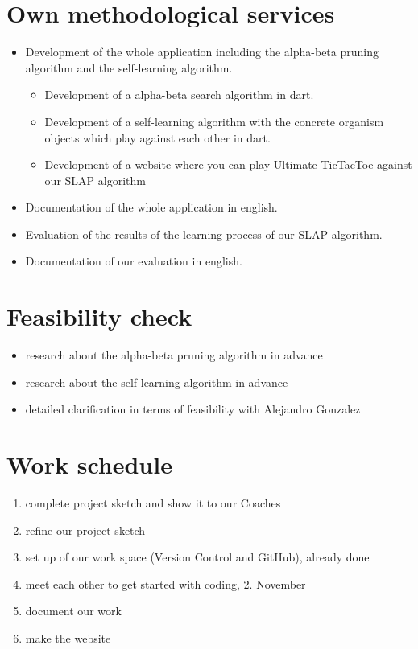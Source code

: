 \section{Own methodological services}
\begin{itemize}
    \item Development of the whole application including the alpha-beta pruning algorithm and the self-learning algorithm.
    \begin{itemize}
	    \item Development of a alpha-beta search algorithm in dart.
	    \item Development of a self-learning algorithm with the concrete organism objects which play against each other in dart.
	    \item Development of a website where you can play Ultimate TicTacToe against our SLAP algorithm
    \end{itemize}
    \item Documentation of the whole application in english.
    \item Evaluation of the results of the learning process of our SLAP algorithm.
    \item Documentation of our evaluation in english.
\end{itemize}


\section{Feasibility check}
\begin{itemize}
    \item research about the alpha-beta pruning algorithm in advance
    \item research about the self-learning algorithm in advance
    \item detailed clarification in terms of feasibility with Alejandro Gonzalez
\end{itemize}

\section{Work schedule}
\begin{enumerate}
    \item complete project sketch and show it to our Coaches
    \item refine our project sketch
    \item set up of our work space (Version Control and GitHub), already done
    \item meet each other to get started with coding, 2. November
    \item document our work
    \item make the website
\end{enumerate}


